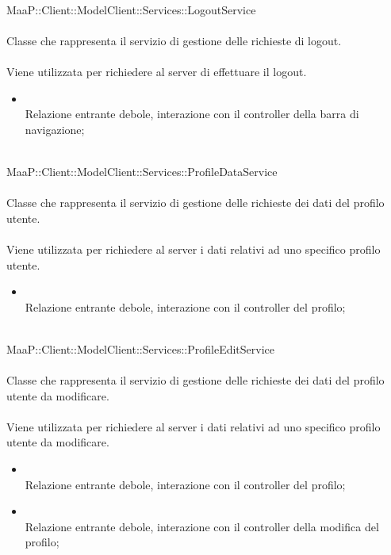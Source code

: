 \\
MaaP::Client::ModelClient::Services::LogoutService\\
\\
Classe che rappresenta il servizio di gestione delle richieste di logout.\\
\\
Viene utilizzata per richiedere al server di effettuare il logout.\\
\begin{itemize}
\item{}\\
Relazione entrante debole, interazione con il controller della barra di navigazione;
\end{itemize}

\\
MaaP::Client::ModelClient::Services::ProfileDataService\\
\\
Classe che rappresenta il servizio di gestione delle richieste dei dati del profilo utente.\\
\\
Viene utilizzata per richiedere al server i dati relativi ad uno specifico profilo utente.\\
\begin{itemize}
\item{}\\
Relazione entrante debole, interazione con il controller del profilo;
\end{itemize}

\\
MaaP::Client::ModelClient::Services::ProfileEditService\\
\\
Classe che rappresenta il servizio di gestione delle richieste dei dati del profilo utente da modificare.\\
\\
Viene utilizzata per richiedere al server i dati relativi ad uno specifico profilo utente da modificare.\\
\begin{itemize}
\item{}\\
Relazione entrante debole, interazione con il controller del profilo;
\item{}\\
Relazione entrante debole, interazione con il controller della modifica del profilo;
\end{itemize}

